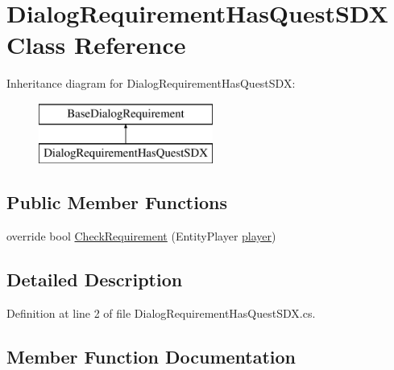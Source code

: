 \hypertarget{class_dialog_requirement_has_quest_s_d_x}{}\section{Dialog\+Requirement\+Has\+Quest\+S\+DX Class Reference}
\label{class_dialog_requirement_has_quest_s_d_x}
Inheritance diagram for Dialog\+Requirement\+Has\+Quest\+S\+DX\+:\begin{figure}[H]
\begin{center}
\leavevmode
\includegraphics[height=2.000000cm]{df/dad/class_dialog_requirement_has_quest_s_d_x}
\end{center}
\end{figure}
\subsection*{Public Member Functions}
\begin{DoxyCompactItemize}
\item 
override bool \mbox{\hyperlink{class_dialog_requirement_has_quest_s_d_x_ab1bb27f179a2e37009034ae989a9df27}{Check\+Requirement}} (Entity\+Player \mbox{\hyperlink{_sphere_i_i_01_music_01_boxes_2_config_2_localization_8txt_a4e2cb8aeff651600ea1cc57fe5a929a4}{player}})
\end{DoxyCompactItemize}


\subsection{Detailed Description}


Definition at line 2 of file Dialog\+Requirement\+Has\+Quest\+S\+D\+X.\+cs.



\subsection{Member Function Documentation}
\mbox{\label{class_dialog_requirement_has_quest_s_d_x_ab1bb27f179a2e37009034ae989a9df27}} 
